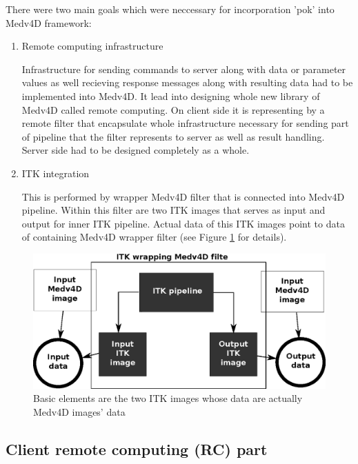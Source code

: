 \par
There were two main goals which were neccessary for incorporation 'pok' into
Medv4D framework:
\begin{enumerate}

  \item{Remote computing infrastructure}
  \par
  Infrastructure for sending commands to server along with data or parameter
values as well recieving response messages along with resulting data had to be
implemented into Medv4D. It lead into designing whole new library of Medv4D
called remote computing. On client side it is representing by a remote filter
that encapsulate whole infrastructure necessary for sending part of pipeline
that the filter represents to server as well as result handling. Server side had
to be designed completely as a whole.

  \item{ITK integration}
  \par
  This is performed by wrapper Medv4D filter that is connected into Medv4D pipeline. Within this filter are two ITK images that serves as input and output for inner ITK pipeline. Actual data of this ITK images point to data of containing Medv4D wrapper filter (see Figure \ref{fg:ITKWrapping} for details).

\end{enumerate}

\begin{figure}
    \centering
    \includegraphics[width=12cm]{data/ITKFilter}
    \caption[ITK wrapper Medv4D filter]{Basic elements are the two ITK images whose data are actually Medv4D images' data}
    \label{fg:ITKWrapping}
\end{figure}

\subsection{Client remote computing (RC) part}

